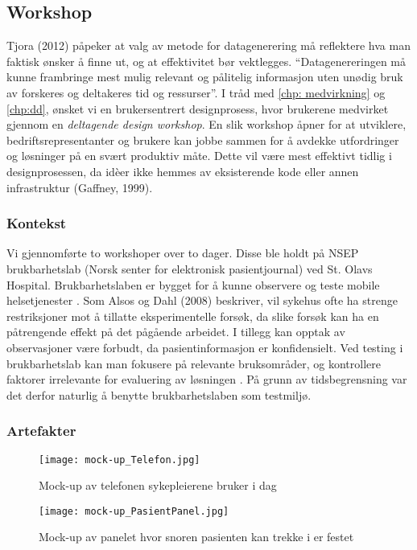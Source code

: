 \subsection{Workshop}
\label{workshops}

Tjora (2012) påpeker at valg av metode for datagenerering må reflektere hva man faktisk ønsker å finne ut, og at effektivitet bør vektlegges. “Datagenereringen må kunne frambringe mest mulig relevant og pålitelig informasjon uten unødig bruk av forskeres og deltakeres tid og ressurser”.
I tråd med \ref{chp: medvirkning} og \ref{chp:dd}, ønsket vi en brukersentrert designprosess, hvor brukerene medvirket gjennom en \emph{deltagende design workshop}.
En slik workshop åpner for at utviklere, bedriftsrepresentanter og brukere kan jobbe sammen for å avdekke utfordringer og løsninger på en svært produktiv måte. Dette vil være mest effektivt tidlig i designprosessen, da idèer ikke hemmes av eksisterende kode eller annen infrastruktur (Gaffney, 1999).

\subsubsection{Kontekst}
Vi gjennomførte to workshoper over to dager. Disse ble holdt på NSEP brukbarhetslab (Norsk senter for elektronisk pasientjournal) ved St. Olavs Hospital. Brukbarhetslaben er bygget for å kunne observere og teste mobile helsetjenester \cite{NSEP}.
Som Alsos og Dahl (2008) beskriver, vil sykehus ofte ha strenge restriksjoner mot å tillatte eksperimentelle forsøk, da slike forsøk kan ha en påtrengende effekt på det pågående arbeidet. I tillegg kan opptak av observasjoner være forbudt, da pasientinformasjon er konfidensielt. Ved testing i brukbarhetslab kan man fokusere på relevante bruksområder, og kontrollere faktorer irrelevante for evaluering av løsningen \cite{Alsos08}. På grunn av tidsbegrensning var det derfor naturlig å benytte brukbarhetslaben som testmiljø.   


\subsubsection{Artefakter}
\begin{figure}[H]
\centering
\texttt{[image: mock-up\_Telefon.jpg]}
\caption{Mock-up av telefonen sykepleierene bruker i dag}
\label{mock-up_Telefon}
\end{figure}

\begin{figure}[H]
\centering
\texttt{[image: mock-up\_PasientPanel.jpg]}
\caption{Mock-up av panelet hvor snoren pasienten kan trekke i er festet}
\label{mock-up_PasientPanel}
\end{figure}

